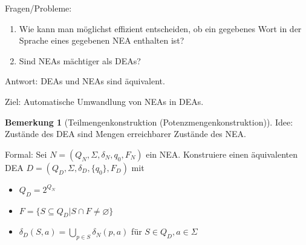 \documentclass[11pt]{article} %
\theoremstyle{definition}
\newtheorem*{bemerkung}{Bemerkung}
\begin{document}
Fragen/Probleme:
\begin{enumerate}
\item Wie kann man möglichst effizient entscheiden, ob ein gegebenes Wort in der Sprache eines gegebenen NEA enthalten ist?
\item Sind NEAs mächtiger als DEAs?
\end{enumerate}

Antwort: DEAs und NEAs sind äquivalent.

Ziel: Automatische Umwandlung von NEAs in DEAs.

\begin{bemerkung}[Teilmengenkonstruktion (Potenzmengenkonstruktion)]
Idee: Zustände des DEA sind Mengen erreichbarer Zustände des NEA.

Formal: Sei $N = (Q_N, \Sigma, \delta_N, q_0, F_N)$ ein NEA. Konstruiere einen äquivalenten DEA $D = (Q_D, \Sigma, \delta_D, \{q_0\}, F_D)$ mit
\begin{itemize}
\item $Q_D = 2^{Q_N}$
\item $F = \{S \subseteq Q_D | S\cap F \neq \varnothing \}$
\item $\delta_D(S, a) = \bigcup\limits_{p \in S} \delta_N(p, a)$ für $S \in Q_D, a \in \Sigma$
\end{itemize}
\end{bemerkung}
\end{document}
